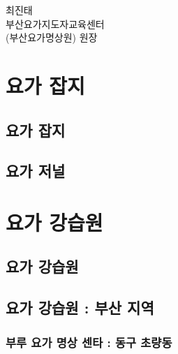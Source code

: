 \documentclass[12pt, a4paper, oneside]{book}
\let\stdsection\section
\renewcommand\section{\newpage\stdsection}
\begin{document}
최진태  \\ 
부산요가지도자교육센터 \\
(부산요가명상원) 원장




	\chapter{요가 잡지}
	\minitoc



		\section{요가 잡지}
	
	
		\section{요가 저널}




	\chapter{요가 강습원}
	\minitoc


		\section{요가 강습원}
	
		\section{요가 강습원 : 부산 지역 }

		\subsection{부루 요가 명상 센타 : 동구 초량동 }
\end{document}
